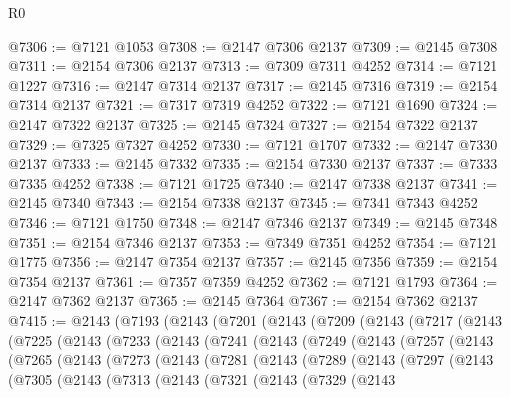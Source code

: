 \begin{lexlean}{R0}
\begin{coremodule}
@7306 := @7121 @1053
@7308 := @2147 @7306 @2137
@7309 := @2145 @7308
@7311 := @2154 @7306 @2137
@7313 := @7309 @7311 @4252
@7314 := @7121 @1227
@7316 := @2147 @7314 @2137
@7317 := @2145 @7316
@7319 := @2154 @7314 @2137
@7321 := @7317 @7319 @4252
@7322 := @7121 @1690
@7324 := @2147 @7322 @2137
@7325 := @2145 @7324
@7327 := @2154 @7322 @2137
@7329 := @7325 @7327 @4252
@7330 := @7121 @1707
@7332 := @2147 @7330 @2137
@7333 := @2145 @7332
@7335 := @2154 @7330 @2137
@7337 := @7333 @7335 @4252
@7338 := @7121 @1725
@7340 := @2147 @7338 @2137
@7341 := @2145 @7340
@7343 := @2154 @7338 @2137
@7345 := @7341 @7343 @4252
@7346 := @7121 @1750
@7348 := @2147 @7346 @2137
@7349 := @2145 @7348
@7351 := @2154 @7346 @2137
@7353 := @7349 @7351 @4252
@7354 := @7121 @1775
@7356 := @2147 @7354 @2137
@7357 := @2145 @7356
@7359 := @2154 @7354 @2137
@7361 := @7357 @7359 @4252
@7362 := @7121 @1793
@7364 := @2147 @7362 @2137
@7365 := @2145 @7364
@7367 := @2154 @7362 @2137
@7415 := @2143
    (@7193
      (@2143
        (@7201
          (@2143
            (@7209
              (@2143
                (@7217
                  (@2143
                    (@7225
                      (@2143
                        (@7233
                          (@2143
                            (@7241
                              (@2143
                                (@7249
                                  (@2143
                                    (@7257
                                      (@2143
                                        (@7265
                                          (@2143
                                            (@7273
                                              (@2143
                                                (@7281
                                                  (@2143
                                                    (@7289
                                                      (@2143
                                                        (@7297
                                                          (@2143
                                                            (@7305
                                                              (@2143
                                                                (@7313
                                                                  (@2143
                                                                    (@7321
                                                                      (@2143
                                                                        (@7329
                                                                          (@2143

\end{coremodule}
\end{lexlean}
